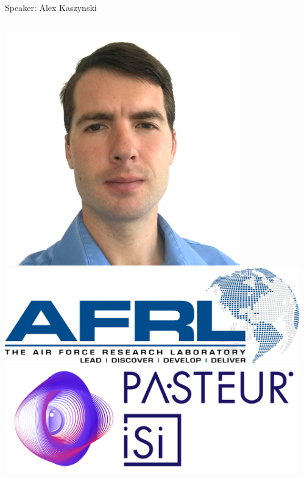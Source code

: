 \documentclass[t]{beamer}
\begin{document}
\begin{frame}{Speaker: Alex Kaszynski}

    \begin{columns}
        \begin{column}{0.3\textwidth}
            \centering
            \includegraphics[width=0.8\textwidth]{figures/alex-kaszynski-trans.png}\\[40pt]
            \includegraphics[width=1.0\textwidth]{figures/afrl-logo.png} \\[40pt]
            \includegraphics[width=1.0\textwidth]{figures/Pasteur.png}
        \end{column}
        \begin{column}{0.7\textwidth}

\end{column}
\end{columns}
\end{frame}
\end{document}
